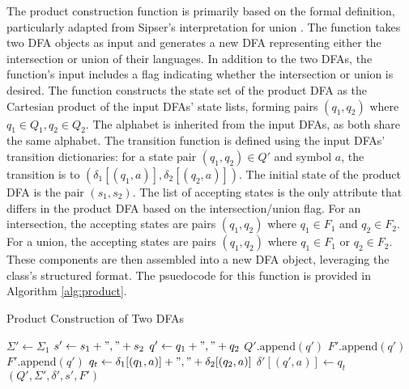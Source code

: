 \documentclass[conference]{IEEEtran}
\begin{document}
The product construction function is primarily based on the formal definition, particularly adapted from Sipser's interpretation for union \cite{b1}. The function takes two DFA objects as input and generates a new DFA representing either the intersection or union of their languages. In addition to the two DFAs, the function's input includes a flag indicating whether the intersection or union is desired. The function constructs the state set of the product DFA as the Cartesian product of the input DFAs’ state lists, forming pairs $(q_1, q_2)$ where $q_1 \in Q_1, q_2 \in Q_2$. The alphabet is inherited from the input DFAs, as both share the same alphabet. The transition function is defined using the input DFAs’ transition dictionaries: for a state pair $(q_1, q_2) \in Q'$ and symbol $a$, the transition is to $(\delta_1[(q_1, a)], \delta_2[(q_2, a)])$. The initial state of the product DFA is the pair $(s_1, s_2)$. The list of accepting states is the only attribute that differs in the product DFA based on the intersection/union flag. For an intersection, the accepting states are pairs $(q_1, q_2)$ where $q_1 \in F_1$ and $q_2 \in F_2$. For a union, the accepting states are pairs $(q_1, q_2)$ where $q_1 \in F_1$ or $q_2 \in F_2$. These components are then assembled into a new DFA object, leveraging the class’s structured format. The psuedocode for this function is provided in Algorithm \ref{alg:product}.

\begin{algorithm}
\caption{Product Construction of Two DFAs}
\label{alg:product}
\begin{algorithmic}
\State $\Sigma' \gets \Sigma_1$
\State $s' \gets s_1 + "," + s_2$
        \State $q' \gets q_1 + "," + q_2$
        \State $Q'.\text{append}(q')$
                \State $F'.\text{append}(q')$
            \EndIf
        \EndIf
                \State $F'.\text{append}(q')$
            \EndIf
        \EndIf
            \State $q_t \gets \delta_1[(q_1, a)] + "," + \delta_2[(q_2, a)]$
            \State $\delta'[(q', a)] \gets q_t$
        \EndFor
    \EndFor
\EndFor
\State \Return {}$(Q', \Sigma', \delta', s', F')$
\end{algorithmic}
\end{algorithm}
\end{document}
